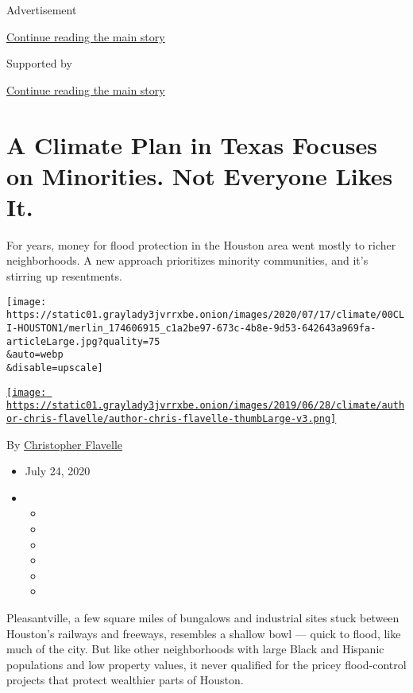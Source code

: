 Advertisement

\protect\hyperlink{after-top}{Continue reading the main story}

Supported by

\protect\hyperlink{after-sponsor}{Continue reading the main story}

\hypertarget{a-climate-plan-in-texas-focuses-on-minorities-not-everyone-likes-it}{%
\section{A Climate Plan in Texas Focuses on Minorities. Not Everyone
Likes
It.}\label{a-climate-plan-in-texas-focuses-on-minorities-not-everyone-likes-it}}

For years, money for flood protection in the Houston area went mostly to
richer neighborhoods. A new approach prioritizes minority communities,
and it's stirring up resentments.

\texttt{[image: https://static01.graylady3jvrrxbe.onion/images/2020/07/17/climate/00CLI-HOUSTON1/merlin\_174606915\_c1a2be97-673c-4b8e-9d53-642643a969fa-articleLarge.jpg?quality=75\\\&auto=webp\\\&disable=upscale]}

\href{https://www.nytimes3xbfgragh.onion/by/christopher-flavelle}{\texttt{[image: https://static01.graylady3jvrrxbe.onion/images/2019/06/28/climate/author-chris-flavelle/author-chris-flavelle-thumbLarge-v3.png]}}

By
\href{https://www.nytimes3xbfgragh.onion/by/christopher-flavelle}{Christopher
Flavelle}

\begin{itemize}
\item
  July 24, 2020
\item
  \begin{itemize}
  \item
  \item
  \item
  \item
  \item
  \item
  \end{itemize}
\end{itemize}

Pleasantville, a few square miles of bungalows and industrial sites
stuck between Houston's railways and freeways, resembles a shallow bowl
--- quick to flood, like much of the city. But like other neighborhoods
with large Black and Hispanic populations and low property values, it
never qualified for the pricey flood-control projects that protect
wealthier parts of Houston.

